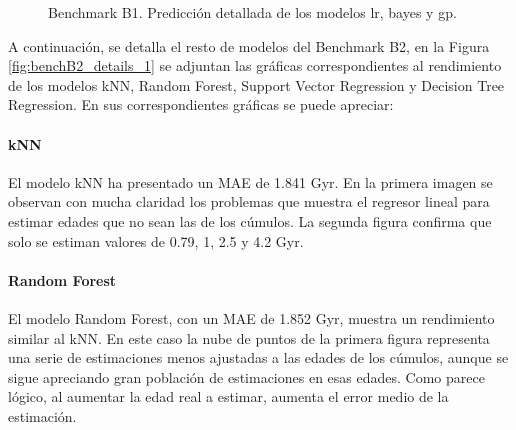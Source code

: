 \begin{figure}[h]
\begin{minipage}{.33\linewidth}
\end{minipage}%
\begin{minipage}{.33\linewidth}
\centering
{}
\end{minipage}
\caption{Benchmark B1. Predicción detallada de los modelos lr, bayes y gp.}
\label{fig:benchB1_details_2}
\end{figure}


A continuación, se detalla el resto de modelos del Benchmark B2, en la Figura \ref{fig:benchB2_details_1} se adjuntan las gráficas correspondientes al rendimiento de los modelos kNN, Random Forest, Support Vector Regression y Decision Tree Regression. En sus correspondientes gráficas se puede apreciar:

\paragraph{kNN} 
El modelo kNN ha presentado un MAE de 1.841 Gyr. En la primera imagen se observan con mucha claridad los problemas que muestra el regresor lineal para estimar edades que no sean las de los cúmulos. La segunda figura confirma que solo se estiman valores de 0.79, 1, 2.5 y 4.2 Gyr. %

\paragraph{Random Forest} 
El modelo Random Forest, con un MAE de 1.852 Gyr, muestra un rendimiento similar al kNN. En este caso la nube de puntos de la primera figura representa una serie de estimaciones menos ajustadas a las edades de los cúmulos, aunque se sigue apreciando gran población de estimaciones en esas edades. Como parece lógico, al aumentar la edad real a estimar, aumenta el error medio de la estimación. %

